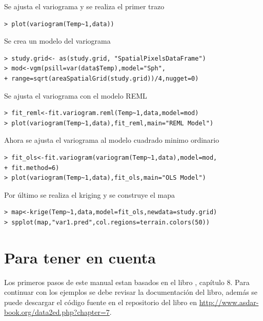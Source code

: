 Se ajusta el variograma y se realiza el primer trazo
\\
\begin{lstlisting}
> plot(variogram(Temp~1,data))
\end{lstlisting}


Se crea un modelo del variograma
\\
\begin{lstlisting}
> study.grid<- as(study.grid, "SpatialPixelsDataFrame")
> mod<-vgm(psill=var(data$Temp),model="Sph",
+ range=sqrt(areaSpatialGrid(study.grid))/4,nugget=0)
\end{lstlisting}

Se ajusta el variograma con el modelo REML
\\
\begin{lstlisting}
> fit_reml<-fit.variogram.reml(Temp~1,data,model=mod)
> plot(variogram(Temp~1,data),fit_reml,main="REML Model")
\end{lstlisting}

Ahora se ajusta el variograma al modelo cuadrado minimo ordinario 
\\
\begin{lstlisting}
> fit_ols<-fit.variogram(variogram(Temp~1,data),model=mod,
+ fit.method=6)
> plot(variogram(Temp~1,data),fit_ols,main="OLS Model")
\end{lstlisting}

Por último se realiza el kriging y se construye el mapa
\\
\begin{lstlisting}
> map<-krige(Temp~1,data,model=fit_ols,newdata=study.grid)
> spplot(map,"var1.pred",col.regions=terrain.colors(50))
\end{lstlisting}


\section{Para tener en cuenta}

Los primeros pasos de este manual estan basados en el libro \cite{bivand2013applied}, capítulo 8. Para continuar con los 
ejemplos se debe revisar la documentación del libro, además se puede descargar el código fuente en el repositorio del libro
en \url{http://www.asdar-book.org/data2ed.php?chapter=7}.
